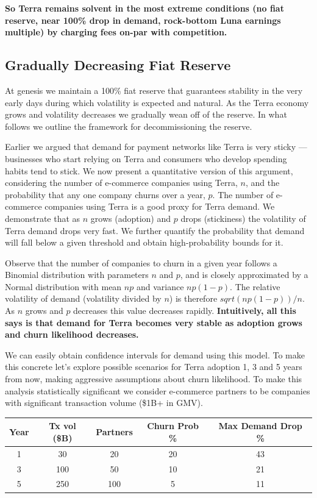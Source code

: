 \documentclass{article}
\begin{document}
\textbf{So Terra remains solvent in the most extreme conditions (no fiat reserve, near 100\% drop in demand, rock-bottom Luna earnings multiple) by charging fees on-par with competition.}

\subsection{Gradually Decreasing Fiat Reserve}

At genesis we maintain a 100\% fiat reserve that guarantees stability in the very early days during which volatility is expected and natural. As the Terra economy grows and volatility decreases we gradually wean off of the reserve. In what follows we outline the framework for decommissioning the reserve.

Earlier we argued that demand for payment networks like Terra is very sticky — businesses who start relying on Terra and consumers who develop spending habits tend to stick. We now present a quantitative version of this argument, considering the number of e-commerce companies using Terra, $n$, and the probability that any one company churns over a year, $p$. The number of e-commerce companies using Terra is a good proxy for Terra demand. We demonstrate that as $n$ grows (adoption) and $p$ drops (stickiness) the volatility of Terra demand drops very fast. We further quantify the probability that demand will fall below a given threshold and obtain high-probability bounds for it.

Observe that the number of companies to churn in a given year follows a Binomial distribution with parameters $n$ and $p$, and is closely approximated by a Normal distribution with mean $np$ and variance $np(1-p)$. The relative volatility of demand (volatility divided by $n$) is therefore $sqrt(np(1-p))/n$. As $n$ grows and $p$ decreases this value decreases rapidly. \textbf{Intuitively, all this says is that demand for Terra becomes very stable as adoption grows and churn likelihood decreases.}

We can easily obtain confidence intervals for demand using this model. To make this concrete let's explore possible scenarios for Terra adoption 1, 3 and 5 years from now, making aggressive assumptions about churn likelihood. To make this analysis statistically significant we consider e-commerce partners to be companies with significant transaction volume (\$1B+ in GMV).

\begin{center}
\begin{tabular}{ |c|c|c|c|c| } 
 \hline
Year & Tx vol (\$B) & Partners & Churn Prob \% & Max Demand Drop \% \\
 \hline \hline
1 & 30 & 20 & 20 & 43 \\
\hline
3 & 100 & 50 & 10 & 21 \\
\hline
5 & 250 & 100 & 5 & 11 \\
 \hline
\end{tabular}
\end{center}
\end{document}
